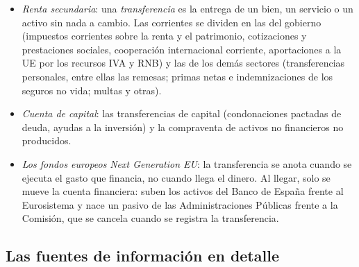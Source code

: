 \documentclass[11pt]{article}
\begin{document}
\begin{itemize}
\item \emph{Renta secundaria}\nocite{FMI2009MBP6}: una \emph{transferencia} es la entrega de un bien, un servicio o un activo sin nada a cambio. Las corrientes se dividen en las del gobierno (impuestos corrientes sobre la renta y el patrimonio, cotizaciones y prestaciones sociales, cooperación internacional corriente, aportaciones a la UE por los recursos IVA y RNB) y las de los demás sectores (transferencias personales, entre ellas las remesas; primas netas e indemnizaciones de los seguros no vida; multas y otras).
\item \emph{Cuenta de capital}\nocite{FMI2009MBP6}: las transferencias de capital (condonaciones pactadas de deuda, ayudas a la inversión) y la compraventa de activos no financieros no producidos.
\item \emph{Los fondos europeos} \emph{Next Generation EU}: la transferencia se anota cuando se ejecuta el gasto que financia, no cuando llega el dinero. Al llegar, solo se mueve la cuenta financiera: suben los activos del Banco de España frente al Eurosistema y nace un pasivo de las Administraciones Públicas frente a la Comisión, que se cancela cuando se registra la transferencia\nocite{BdE2022NGEU}.
\end{itemize}

\subsection*{Las fuentes de información en detalle}
\end{document}

